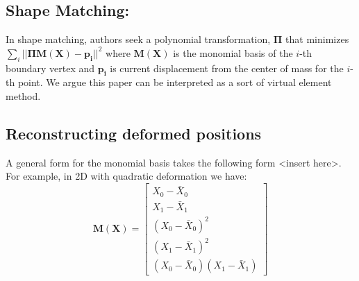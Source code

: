 \documentclass[sigconf]{acmart}
\begin{document}
\subsection{Shape Matching: }
In shape matching, authors seek a polynomial transformation, $\mathbf{\Pi}$ that minimizes $\sum_i ||\mathbf{\Pi}\mathbf{M(X)} - \mathbf{p_i}||^2$ where $\mathbf{M(X)}$ is the monomial basis of the $i$-th boundary vertex and $\mathbf{p_i}$ is current displacement from the center of mass for the $i$-th point. We argue this paper can be interpreted as a sort of virtual element method. \\

\subsection{Reconstructing deformed positions}
A general form for the monomial basis takes the following form <insert here>. For example, in 2D with quadratic deformation we have:
\begin{equation}
    \mathbf{M(X)} =\begin{bmatrix}
    X_0 - \bar{X}_0  \\ 
    X_1 - \bar{X}_1  \\ 
    (X_0 - \bar{X}_0)^2  \\ 
    (X_1 - \bar{X}_1)^2  \\ 
    (X_0 - \bar{X}_0)(X_1 - \bar{X}_1) 
    \end{bmatrix} 
\end{equation}
\end{document}
